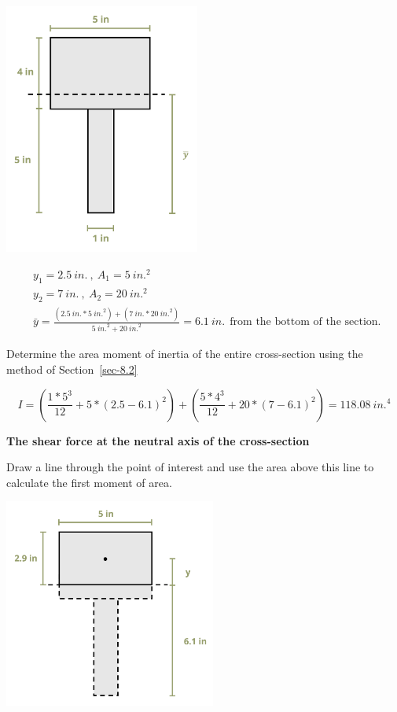 \documentclass[
  letterpaper,
  DIV=11,
  numbers=noendperiod]{scrreprt}
\theoremstyle{definition}
\theoremstyle{remark}
\begin{document}
\begin{tcolorbox}
\begin{tcolorbox}
\begin{center}
\includegraphics[width=2.53125in,height=\textheight]{images/CH10 PNGs/example 10.4 part 2.png}
\end{center}

\[
\begin{aligned}
& y_1=2.5{~in.}~,~ A_1=5{~in.}^2 \\
& y_2=7{~in.}~,~ A_2=20{~in.}^2 \\
& \bar{y}=\frac{(2.5{~in.} * 5{~in.}^2)+(7{~in.} * 20{~in.}^2)}{5{~in.}^2+20{~in.}^2}=6.1{~in.}~~ \text{from the bottom of the section. }
\end{aligned}
\]

Determine the area moment of inertia of the entire cross-section using
the method of Section~\ref{sec-8.2}

\[
I=\left(\frac{1 * 5^3}{12}+5 *(2.5-6.1)^2\right)+\left(\frac{5 * 4^3}{12}+20 *(7-6.1)^2\right)=118.08{~in.}^4
\]

\textbf{The shear force at the neutral axis of the cross-section}

Draw a line through the point of interest and use the area above this
line to calculate the first moment of area.

\begin{center}
\includegraphics[width=2.73958in,height=\textheight]{images/CH10 PNGs/example 10.4 part 3.png}
\end{center}


\end{tcolorbox}
\end{tcolorbox}
\end{document}
